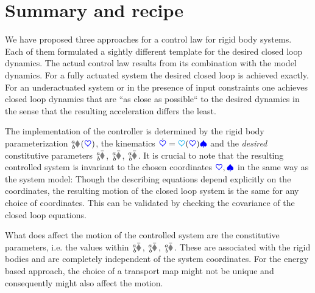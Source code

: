 \section{Summary and recipe}
We have proposed three approaches for a control law for rigid body systems.
Each of them formulated a sightly different template for the desired closed loop dynamics.
The actual control law results from its combination with the model dynamics.
For a fully actuated system the desired closed loop is achieved exactly.
For an underactuated system or in the presence of input constraints one achieves closed loop dynamics that are ``as close as possible`` to the desired dynamics in the sense that the resulting acceleration differs the least.

The implementation of the controller is determined by the rigid body parameterization $\bodyHomoCoord{\BidxI}{\BidxII}(\sysCoord)$, the kinematics $\dot{\boldsymbol{\textcolor{blue}{\heartsuit}}} = \boldsymbol{\textcolor{cyan}{\heartsuit}}(\boldsymbol{\textcolor{blue}{\heartsuit}}) \boldsymbol{\textcolor{blue}{\spadesuit}}$ and the \textit{desired} constitutive parameters $\bodyInertiaMatC{\BidxI}{\BidxII}$, $\bodyDissMatC{\BidxI}{\BidxII}$, $\bodyStiffMatC{\BidxI}{\BidxII}$.
It is crucial to note that the resulting controlled system is invariant to the chosen coordinates $\boldsymbol{\textcolor{blue}{\heartsuit}}, \boldsymbol{\textcolor{blue}{\spadesuit}}$ in the same way as the system model:
Though the describing equations depend explicitly on the coordinates, the resulting motion of the closed loop system is the same for any choice of coordinates.
This can be validated by checking the covariance of the closed loop equations.

What does affect the motion of the controlled system are the constitutive parameters, i.e. the values within $\bodyInertiaMatC{\BidxI}{\BidxII}$, $\bodyDissMatC{\BidxI}{\BidxII}$, $\bodyStiffMatC{\BidxI}{\BidxII}$.
These are associated with the rigid bodies and are completely independent of the system coordinates.
For the energy based approach, the choice of a transport map might not be unique and consequently might also affect the motion.

